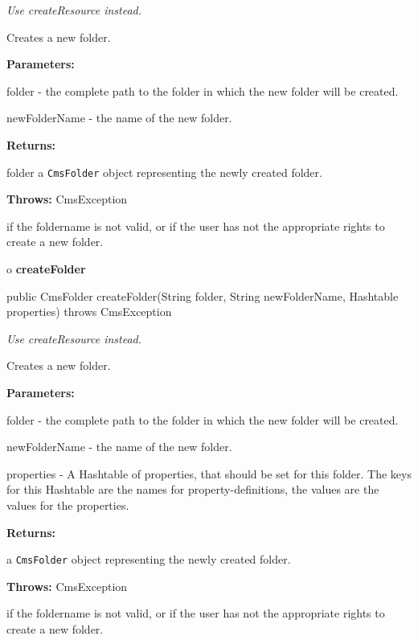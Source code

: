 \begin{description}
 {\it Use createResource
instead.}

Creates a new folder.

\begin{description}
\item {\bf Parameters:}

folder - the complete path to the folder in which the new folder will be
created.

newFolderName - the name of the new folder.
\item {\bf Returns:}

folder a {\tt CmsFolder} object representing the newly created folder.
\item {\bf Throws:} CmsException

if the foldername is not valid, or if the user has not the appropriate rights
to create a new folder.
\end{description}

\end{description}

o {\bf createFolder}

\begin{PRE}
 public CmsFolder createFolder(String folder,
                               String newFolderName,
                               Hashtable properties) throws CmsException
\end{PRE}

\begin{description}
 {\it Use createResource
instead.}

Creates a new folder.

\begin{description}
\item {\bf Parameters:}

folder - the complete path to the folder in which the new folder will be
created.

newFolderName - the name of the new folder.

properties - A Hashtable of properties, that should be set for this folder.
The keys for this Hashtable are the names for property-definitions, the values
are the values for the properties.
\item {\bf Returns:}

a {\tt CmsFolder} object representing the newly created folder.
\item {\bf Throws:} CmsException

if the foldername is not valid, or if the user has not the appropriate rights
to create a new folder.
\end{description}

\end{description}

